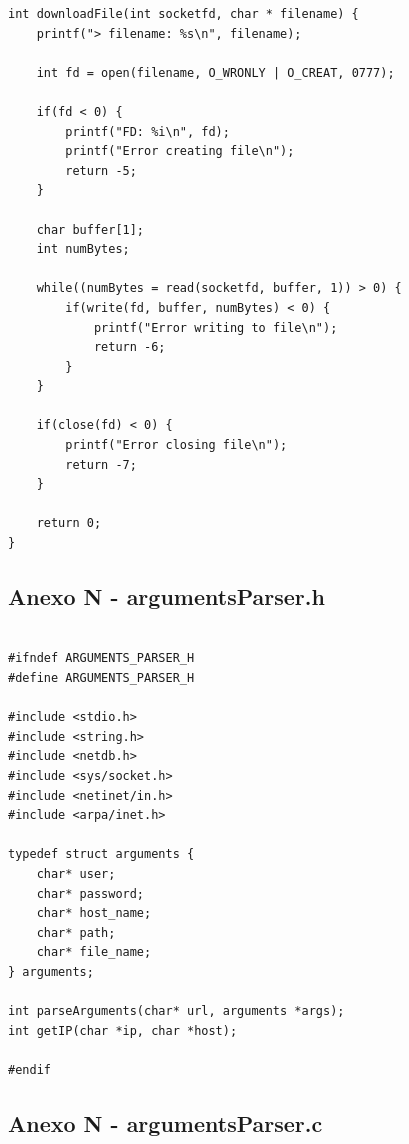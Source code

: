 \documentclass[11pt]{article}
\begin{document}
\begin{lstlisting}[style=CStyle]
int downloadFile(int socketfd, char * filename) {
    printf("> filename: %s\n", filename);

    int fd = open(filename, O_WRONLY | O_CREAT, 0777);

    if(fd < 0) {
        printf("FD: %i\n", fd);
        printf("Error creating file\n");
        return -5;
    }

    char buffer[1];
    int numBytes;

    while((numBytes = read(socketfd, buffer, 1)) > 0) {
        if(write(fd, buffer, numBytes) < 0) {
            printf("Error writing to file\n");
            return -6;
        }
    }

    if(close(fd) < 0) {
        printf("Error closing file\n");
        return -7;
    }

    return 0;
}

\end{lstlisting}

\subsection{ Anexo N - argumentsParser.h}

\begin{lstlisting}[style=CStyle]

#ifndef ARGUMENTS_PARSER_H
#define ARGUMENTS_PARSER_H

#include <stdio.h>
#include <string.h>
#include <netdb.h> 
#include <sys/socket.h>
#include <netinet/in.h>
#include <arpa/inet.h>

typedef struct arguments {
    char* user;
    char* password;
    char* host_name;
    char* path;
    char* file_name;
} arguments;

int parseArguments(char* url, arguments *args);
int getIP(char *ip, char *host);

#endif

\end{lstlisting}

\subsection{ Anexo N - argumentsParser.c}
\end{document}
